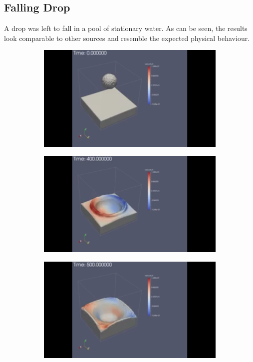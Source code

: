 \documentclass[10pt,a4paper,notitlepage]{article}
\begin{document}
\subsection{Falling Drop}
A drop was left to fall in a pool of stationary water. As can be seen, the results look comparable to other sources and resemble the expected physical behaviour.
\begin{figure}[H]
\centering
\begin{subfigure}{0.25\textwidth}
  \includegraphics[width=1.0\linewidth]{drop/1.png}
\end{subfigure}%
\begin{subfigure}{0.25\textwidth}
  \includegraphics[width=1.0\linewidth]{drop/2.png}
\end{subfigure}
\begin{subfigure}{0.25\textwidth}
  \includegraphics[width=1.0\linewidth]{drop/3.png}

\end{subfigure}
\end{figure}
\end{document}
